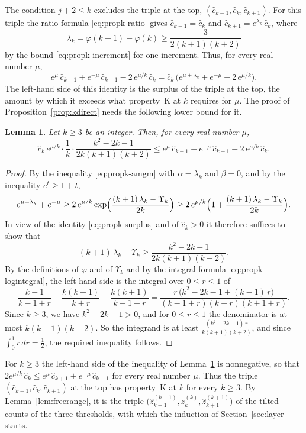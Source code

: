 \documentclass{amsart}
\newtheorem{lemma}[theorem]{Lemma}
\theoremstyle{definition}
\theoremstyle{remark}
\numberwithin{equation}{section}
\begin{document}
The condition $j+2\le k$ excludes the triple at the top, $(\hat c_{k-1},\hat c_k,\hat c_{k+1})$. For this triple the ratio formula \eqref{eq:propk-ratio} gives $\hat c_{k-1}=\hat c_k$ and $\hat c_{k+1}=e^{\lambda_k}\,\hat c_k$, where
\[
\lambda_k=\varphi(k+1)-\varphi(k)\ge\frac{3}{2(k+1)(k+2)}
\]
by the bound \eqref{eq:propk-increment} for one increment. Thus, for every real number $\mu$,
\begin{equation}\label{eq:propk-surplus}
e^{\mu}\,\hat c_{k+1}+e^{-\mu}\,\hat c_{k-1}-2\,e^{\mu/k}\,\hat c_k=\hat c_k\,\bigl(e^{\mu+\lambda_k}+e^{-\mu}-2\,e^{\mu/k}\bigr).
\end{equation}
The left-hand side of this identity is the surplus of the triple at the top, the amount by which it exceeds what property~K at $k$ requires for $\mu$. The proof of Proposition~\ref{prop:kdirect} needs the following lower bound for it.

\begin{lemma}\label{lem:topsurplus}
Let $k\ge 3$ be an integer. Then, for every real number $\mu$,
\[
\hat c_k\,e^{\mu/k}\cdot\frac1k\cdot\frac{k^2-2k-1}{2k(k+1)(k+2)}\le e^{\mu}\,\hat c_{k+1}+e^{-\mu}\,\hat c_{k-1}-2\,e^{\mu/k}\,\hat c_k.
\]
\end{lemma}

\begin{proof}
By the inequality \eqref{eq:propk-amgm} with $\alpha=\lambda_k$ and $\beta=0$, and by the inequality $e^{t}\ge 1+t$,
\[
e^{\mu+\lambda_k}+e^{-\mu}\ge 2\,e^{\mu/k}\exp\Bigl(\frac{(k+1)\,\lambda_k-\Upsilon_k}{2k}\Bigr)\ge 2\,e^{\mu/k}\Bigl(1+\frac{(k+1)\,\lambda_k-\Upsilon_k}{2k}\Bigr).
\]
In view of the identity \eqref{eq:propk-surplus} and of $\hat c_k>0$ it therefore suffices to show that
\[
(k+1)\,\lambda_k-\Upsilon_k\ge\frac{k^2-2k-1}{2k(k+1)(k+2)}.
\]
By the definitions of $\varphi$ and of $\Upsilon_k$ and by the integral formula \eqref{eq:propk-logintegral}, the left-hand side is the integral over $0\le r\le 1$ of
\[
\frac{k-1}{k-1+r}-\frac{k(k+1)}{k+r}+\frac{k(k+1)}{k+1+r}=\frac{r\,\bigl(k^2-2k-1+(k-1)\,r\bigr)}{(k-1+r)(k+r)(k+1+r)}.
\]
Since $k\ge 3$, we have $k^2-2k-1>0$, and for $0\le r\le 1$ the denominator is at most $k(k+1)(k+2)$. So the integrand is at least $\frac{(k^2-2k-1)\,r}{k(k+1)(k+2)}$, and since $\int_0^1r\,dr=\frac12$, the required inequality follows.
\end{proof}

For $k\ge 3$ the left-hand side of the inequality of Lemma~\ref{lem:topsurplus} is nonnegative, so that $2e^{\mu/k}\,\hat c_k\le e^{\mu}\,\hat c_{k+1}+e^{-\mu}\,\hat c_{k-1}$ for every real number $\mu$. Thus the triple $(\hat c_{k-1},\hat c_k,\hat c_{k+1})$ at the top has property~K at $k$ for every $k\ge 3$. By Lemma~\ref{lem:freerange}, it is the triple $\bigl(\hat z^{(k-1)}_{k-1},\hat z^{(k)}_{k},\hat z^{(k+1)}_{k+1}\bigr)$ of the tilted counts of the three thresholds, with which the induction of Section~\ref{sec:layer} starts.
\end{document}
